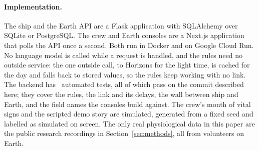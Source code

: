 \paragraph{Implementation.}
The ship and the Earth API are a Flask application with SQLAlchemy over SQLite or PostgreSQL. The crew and Earth consoles are a Next.js application that polls the API once a second. Both run in Docker and on Google Cloud Run. No language model is called while a request is handled, and the rules need no outside service: the one outside call, to Horizons for the light time, is cached for the day and falls back to stored values, so the rules keep working with no link. The backend has \numTestCount~automated tests, all of which pass on the commit described here; they cover the rules, the link and its delays, the wall between ship and Earth, and the field names the consoles build against. The crew's month of vital signs and the scripted demo story are simulated, generated from a fixed seed and labelled as simulated on screen. The only real physiological data in this paper are the public research recordings in Section~\ref{sec:methods}, all from volunteers on Earth.
